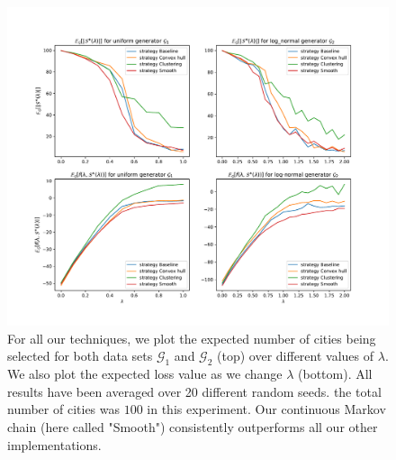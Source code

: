 \documentclass[conference,compsoc]{IEEEtran}
\begin{document}
\begin{figure}
    \centering
    \includegraphics[width=\linewidth, trim=55 55 55 55, clip]{images/Expectation_f_num_cities_100.pdf}
    \caption{For all our techniques, we plot the expected number of cities being
    selected for both data sets $\mathcal{G}_1$ and $\mathcal{G}_2$ (top) over
    different values of $\lambda$. We also plot the expected loss value as we
    change $\lambda$ (bottom). All results have been averaged over 20 different
    random seeds. the total number of cities was $100$ in this experiment. Our
    continuous Markov chain (here called "Smooth") consistently outperforms all
    our other implementations.}
    \label{fig:loss_plots100}
\end{figure}
\end{document}
